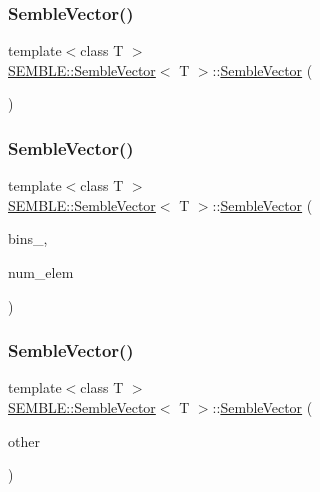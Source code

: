 \subsubsection{\texorpdfstring{SembleVector()}{SembleVector()}\hspace{0.1cm}{\footnotesize\ttfamily [1/8]}}
{\footnotesize\ttfamily template$<$class T $>$ \\
\mbox{\hyperlink{structSEMBLE_1_1SembleVector}{S\+E\+M\+B\+L\+E\+::\+Semble\+Vector}}$<$ T $>$\+::\mbox{\hyperlink{structSEMBLE_1_1SembleVector}{Semble\+Vector}} (\begin{DoxyParamCaption}\item[{void}]{ }\end{DoxyParamCaption})}

\mbox{\label{structSEMBLE_1_1SembleVector_a84340fccafe642a4754727fbc95e6356}} 
\subsubsection{\texorpdfstring{SembleVector()}{SembleVector()}\hspace{0.1cm}{\footnotesize\ttfamily [2/8]}}
{\footnotesize\ttfamily template$<$class T $>$ \\
\mbox{\hyperlink{structSEMBLE_1_1SembleVector}{S\+E\+M\+B\+L\+E\+::\+Semble\+Vector}}$<$ T $>$\+::\mbox{\hyperlink{structSEMBLE_1_1SembleVector}{Semble\+Vector}} (\begin{DoxyParamCaption}\item[{int}]{bins\+\_\+,  }\item[{int}]{num\+\_\+elem }\end{DoxyParamCaption})}

\mbox{\label{structSEMBLE_1_1SembleVector_a929ee26afcab4cb287ad02440bb6bde2}} 
\subsubsection{\texorpdfstring{SembleVector()}{SembleVector()}\hspace{0.1cm}{\footnotesize\ttfamily [3/8]}}
{\footnotesize\ttfamily template$<$class T $>$ \\
\mbox{\hyperlink{structSEMBLE_1_1SembleVector}{S\+E\+M\+B\+L\+E\+::\+Semble\+Vector}}$<$ T $>$\+::\mbox{\hyperlink{structSEMBLE_1_1SembleVector}{Semble\+Vector}} (\begin{DoxyParamCaption}\item[{const \mbox{\hyperlink{structSEMBLE_1_1SembleVector}{Semble\+Vector}}$<$ T $>$ \&}]{other }\end{DoxyParamCaption})}


